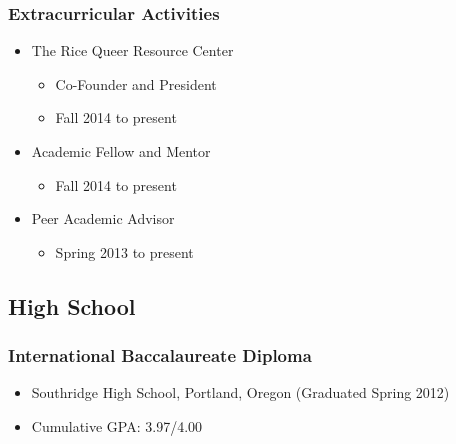 \documentclass[a4paper]{article}
\begin{document}
\subsubsection{Extracurricular Activities}

\begin{itemize}

    \item{The Rice Queer Resource Center}
    \begin{itemize}
        \item{Co-Founder and President}
        \item{Fall 2014 to present}
    \end{itemize}

    \item{Academic Fellow and Mentor}
    \begin{itemize}
        \item{Fall 2014 to present}
    \end{itemize}

    \item{Peer Academic Advisor}
    \begin{itemize}
        \item{Spring 2013 to present}
    \end{itemize}

\end{itemize}





\subsection{High School}

\subsubsection{International Baccalaureate Diploma}

\begin{itemize}

    \item{Southridge High School, Portland, Oregon (Graduated Spring 2012)}

    \item{Cumulative GPA: 3.97/4.00}

\end{itemize}
\end{document}
